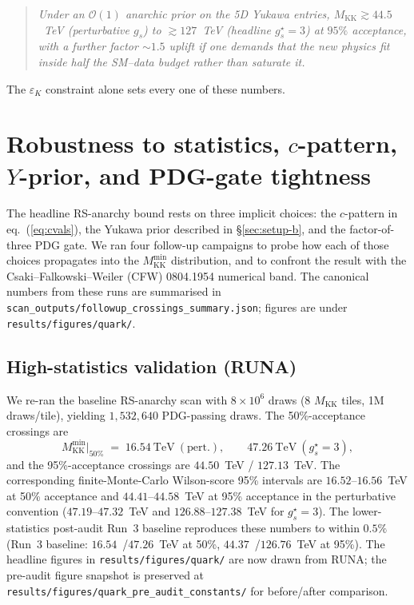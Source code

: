 \documentclass[11pt]{article}
\newcommand{\Mkk}{M_{\mathrm{KK}}}
\newcommand{\gs}{g_s^{\star}}
\newcommand{\eK}{\varepsilon_K}
\begin{document}
\begin{quote}\itshape
  Under an $\mathcal{O}(1)$ anarchic prior on the 5D Yukawa entries,
  $\Mkk \gtrsim 44.5$~TeV (perturbative $g_s$) to $\gtrsim 127$~TeV
  (headline $\gs = 3$) at $95\%$ acceptance, with a further factor
  $\sim 1.5$ uplift if one demands that the new physics fit inside half
  the SM--data budget rather than saturate it.
\end{quote}

\noindent The $\eK$ constraint alone sets every one of these numbers.

\section{Robustness to statistics, $c$-pattern, $Y$-prior, and PDG-gate tightness}
\label{sec:robustness}

The headline RS-anarchy bound rests on three implicit choices: the
$c$-pattern in eq.~(\ref{eq:cvals}), the Yukawa prior described in
\S\ref{sec:setup-b}, and the factor-of-three PDG gate. We ran four
follow-up campaigns to probe how each of those choices propagates into
the $\Mkk^{\min}$ distribution, and to confront the result with the
Csaki--Falkowski--Weiler (CFW) 0804.1954 numerical band. The canonical
numbers from these runs are summarised in
\texttt{scan\_outputs/followup\_crossings\_summary.json}; figures are
under \texttt{results/figures/quark/}.

\subsection{High-statistics validation (RUNA)}
\label{sec:robust-runa}

We re-ran the baseline RS-anarchy scan with $8\!\times\!10^{6}$ draws
(8 $\Mkk$ tiles, 1M draws/tile), yielding $1{,}532{,}640$
PDG-passing draws. The 50\%-acceptance crossings are
\begin{equation}
  \Mkk^{\min}\bigl|_{50\%} \;=\; 16.54~\mathrm{TeV~(pert.)},
  \qquad
  47.26~\mathrm{TeV}~(\gs = 3),
\end{equation}
and the 95\%-acceptance crossings are $44.50$~TeV / $127.13$~TeV.
The corresponding finite-Monte-Carlo Wilson-score 95\% intervals are
$16.52$--$16.56$~TeV at 50\% acceptance and $44.41$--$44.58$~TeV at
95\% acceptance in the perturbative convention
($47.19$--$47.32$~TeV and $126.88$--$127.38$~TeV for $\gs=3$).
The lower-statistics post-audit Run~3 baseline reproduces these numbers
to within $0.5\%$ (Run~3 baseline: $16.54$~/$47.26$~TeV at 50\%,
$44.37$~/$126.76$~TeV at 95\%). The headline figures
in \texttt{results/figures/quark/} are now drawn from RUNA; the
pre-audit figure snapshot is preserved at
\texttt{results/figures/quark\_pre\_audit\_constants/} for
before/after comparison.
\end{document}
